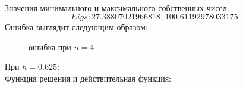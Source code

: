 \documentclass[12pt,a4paper]{scrartcl}
\begin{document}
\\
Значения минимального и максимального собственных чисел: 
\[
	Eigs:  27.38807021966818 \;\;100.61192978033175
\]
Ошибка выглядит следующим образом:
\\
\begin{figure}[h]
	\caption{ошибка при $n=4$}
	\label{ris:image}
\end{figure}
\newpage
При $h = 0.625$:
\\
Функция решения и действительная функция:
\\
\end{document}

